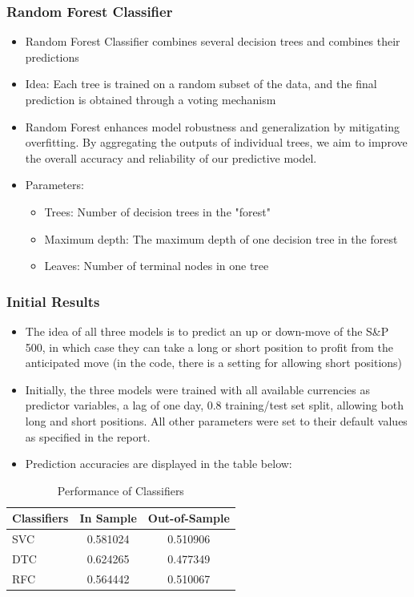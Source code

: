 \documentclass{beamer}
\begin{document}
\begin{frame}
\frametitle{Random Forest Classifier}
\begin{itemize}
\item Random Forest Classifier combines several decision trees and combines their predictions
\item Idea:  Each tree is trained on a random subset of the data, and the final prediction is obtained through a voting mechanism
\item  Random Forest enhances model robustness and generalization by mitigating overfitting. By aggregating the outputs of individual trees, we aim to improve the overall accuracy and reliability of our predictive model.
\item Parameters: 
    \begin{itemize}
    \item Trees: Number of decision trees in the "forest" 
    \item Maximum depth: The maximum depth of one decision tree in the forest
    \item Leaves: Number of terminal nodes in one tree
    \end{itemize}
\end{itemize}
\end{frame}

\begin{frame}
\frametitle{Initial Results}
\begin{itemize}
\item The idea of all three models is to predict an up or down-move of the S\&P 500, in which case they can take a long or short position to profit from the anticipated move (in the code, there is a setting for allowing short positions)
\item Initially, the three models were trained with all available currencies as predictor variables, a lag of one day, 0.8 training/test set split, allowing both long and short positions. All other parameters were set to their default values as specified in the report.
\item Prediction accuracies are displayed in the table below:
\end{itemize}
\begin{table}[h]
  \centering
  \begin{tabular}{lcc}
    \hline
    Classifiers & In Sample & Out-of-Sample \\
    \hline
    SVC & 0.581024 & 0.510906 \\
    DTC & 0.624265 & 0.477349 \\
    RFC & 0.564442 & 0.510067 \\
    \hline
  \end{tabular}
  \caption{Performance of Classifiers}
  \label{tab: classifier_performance}
\end{table}
\end{frame}
\end{document}
